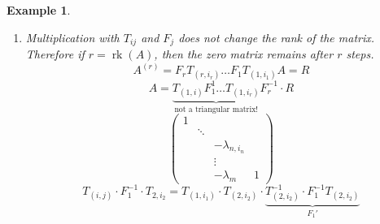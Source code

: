 \documentclass[a4paper,landscape,twocolumn]{article}
\newtheorem{ex}{Example}
\begin{document}
\begin{ex}
\begin{enumerate}
\begin{enumerate}
\[\begin{matrix}
              \vdots &  & & & & & \vdots
            \end{matrix}
          \] \[
            \text{with } a'_{i_2,j_2} = a_{i_2 j_2} - \lambda_{i_2}^{(i)} \cdot a_{i,j_2}
          \] \[
            F_2 = \begin{matrix}
              1 & 0 & & \\
              \lambda_j^{(2)} & 1 & & \\
              \vdots & & \ddots & \vdots \\
              \lambda_m^{(2)} & \ldots & \ldots & \ldots
            \end{matrix}
          \] \[
            \lambda_i^{(2)} = \begin{pmatrix}
              -\frac{a_{i,j_2}}{a'_{i_2,j_2}} & \\
              &
            \end{pmatrix}
          \]
          The first column is kepts unmodified $\rightarrow$ Frobenius matrix.
          \[
            F_2 \cdot T_{(2,i_2)} \cdot F_1 \cdot T_{(1,i_1)} \cdot A =
            \begin{pmatrix}
              \infty & a_{i,j_1} & \ldots & \ldots & \ldots & \ldots & \ldots & \ldots \\
              \vdots & 0 & 0 & 0 & a_{i_2,j_2} & \ldots & \ldots & \ldots \\
              \vdots & \vdots & \vdots & \vdots & \vdots & \vdots & \vdots & \vdots \\
              0 & 0 & 0 & 0 & \ldots & \ldots & \ldots & \ldots
            \end{pmatrix}
          \]
          where at the bottom-right a $m-2\times n-j_2$ submatrix is given.
        \item Multiplication with $T_{ij}$ and $F_j$ does not change the rank of the matrix.
          Therefore if $r = \operatorname{rk}(A)$, then the zero matrix remains after $r$ steps.
          \[ A^{(r)} = F_r T_{(r,i_r)} \ldots F_1 T_{(1,i_1)} A = R \]
          \[ A = \underbrace{T_{(1,i)} F_1^1 \ldots T_{(1,i_r)}}_{\text{not a triangular matrix!}} F_r^{-1} \cdot R \]
          \[
            \begin{pmatrix}
              1 &  & & \\
                & \ddots & & \\
                &  & -\lambda_{n,i_n} & \\
                &  & \vdots & \\
                &  & -\lambda_m & 1
            \end{pmatrix}
          \]
          \[ T_{(i,j)} \cdot F_1^{-1} \cdot T_{2,i_2} = T_{(1,i_1)} \cdot T_{(2,i_2)} \cdot \underbrace{T_{(2,i_2)}^{-1} \cdot F_1^{-1} T_{(2,i_2)}}_{F_1'} \]
      \end{enumerate}
  \end{enumerate}
\end{ex}
\end{document}
